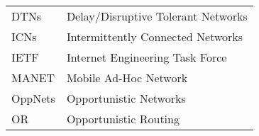 %

\begin{tabular}{ll}
DTNs & Delay/Disruptive Tolerant Networks\\
ICNs & Intermittently Connected Networks\\
IETF & Internet Engineering Task Force\\
MANET & Mobile Ad-Hoc Network\\
OppNets & Opportunistic Networks\\
OR & Opportunistic Routing\\
\end{tabular}


